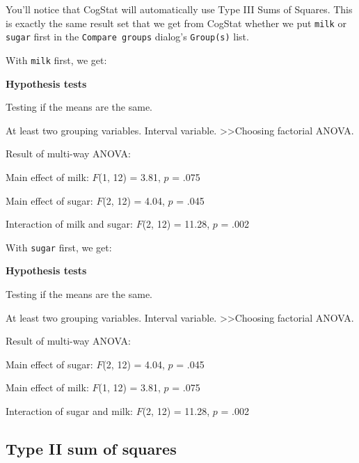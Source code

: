 \documentclass[
  11pt,
  a4paper,
  twoside,symmetric,openright]{book}
\theoremstyle{break}
\theoremstyle{break}
\begin{document}
You'll notice that CogStat will automatically use Type III Sums of Squares. This is exactly the same result set that we get from CogStat whether we put \texttt{milk} or \texttt{sugar} first in the \texttt{Compare\ groups} dialog's \texttt{Group(s)} list.

With \texttt{milk} first, we get:

\begin{tcolorbox}[colback=white,
  colframe=lightgray,
  coltext=black,
  boxsep=4pt,
  boxrule=0.3pt,
  arc=0pt]
  {   \sffamily
      \color{CSblue}\textbf{Hypothesis tests}
      
      \color{CSgreen}Testing if the means are the same.
      
      At least two grouping variables. Interval variable. \textgreater\textgreater Choosing factorial ANOVA.

      \color{black}
      Result of multi-way ANOVA:

      Main effect of milk: $F$(1, 12) = 3.81, $p$ = .075

      Main effect of sugar: $F$(2, 12) = 4.04, $p$ = .045

      Interaction of milk and sugar: $F$(2, 12) = 11.28, $p$ = .002
      \normalfont
  }
\end{tcolorbox}

With \texttt{sugar} first, we get:

\begin{tcolorbox}[colback=white,
  colframe=lightgray,
  coltext=black,
  boxsep=4pt,
  boxrule=0.3pt,
  arc=0pt]
  {   \sffamily
      \color{CSblue}\textbf{Hypothesis tests}
      
      \color{CSgreen}Testing if the means are the same.
      
      At least two grouping variables. Interval variable. \textgreater\textgreater Choosing factorial ANOVA.

      \color{black}
      Result of multi-way ANOVA:

      Main effect of sugar: $F$(2, 12) = 4.04, $p$ = .045

      Main effect of milk: $F$(1, 12) = 3.81, $p$ = .075

      Interaction of sugar and milk: $F$(2, 12) = 11.28, $p$ = .002
      \normalfont
  }
\end{tcolorbox}

\subsection{Type II sum of squares}\label{type-ii-sum-of-squares}
\end{document}
